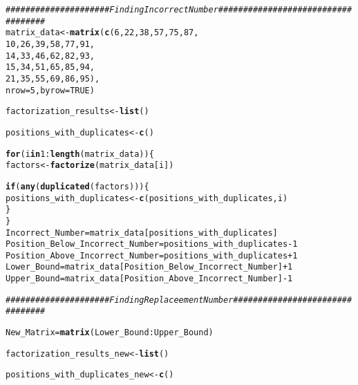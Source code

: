 \documentclass{article}\usepackage[]{graphicx}\usepackage[]{xcolor}
\makeatletter
\newcommand{\hlnum}[1]{\textcolor[rgb]{0.686,0.059,0.569}{#1}}%
\newcommand{\hlcom}[1]{\textcolor[rgb]{0.678,0.584,0.686}{\textit{#1}}}%
\newcommand{\hlopt}[1]{\textcolor[rgb]{0,0,0}{#1}}%
\newcommand{\hldef}[1]{\textcolor[rgb]{0.345,0.345,0.345}{#1}}%
\newcommand{\hlkwa}[1]{\textcolor[rgb]{0.161,0.373,0.58}{\textbf{#1}}}%
\newcommand{\hlkwb}[1]{\textcolor[rgb]{0.69,0.353,0.396}{#1}}%
\newcommand{\hlkwc}[1]{\textcolor[rgb]{0.333,0.667,0.333}{#1}}%
\newcommand{\hlkwd}[1]{\textcolor[rgb]{0.737,0.353,0.396}{\textbf{#1}}}%
\newenvironment{kframe}{%
 \def\at@end@of@kframe{}%
 \ifinner\ifhmode%
  \def\at@end@of@kframe{\end{minipage}}%
  \begin{minipage}{\columnwidth}%
 \fi\fi%
 \def\FrameCommand##1{\hskip\@totalleftmargin \hskip-\fboxsep
 \colorbox{shadecolor}{##1}\hskip-\fboxsep
     \hskip-\linewidth \hskip-\@totalleftmargin \hskip\columnwidth}%
 \MakeFramed {\advance\hsize-\width
   \@totalleftmargin\z@ \linewidth\hsize
   \@setminipage}}%
 {\par\unskip\endMakeFramed%
 \at@end@of@kframe}
\newenvironment{knitrout}{}{} %
\makeatother
\begin{document}
\begin{enumerate}
\begin{knitrout}
\begin{kframe}
\begin{alltt}
\hlcom{#####################Finding Incorrect Number###################################}
\hldef{matrix_data} \hlkwb{<-} \hlkwd{matrix}\hldef{(}\hlkwd{c}\hldef{(}\hlnum{6}\hldef{,} \hlnum{22}\hldef{,} \hlnum{38}\hldef{,} \hlnum{57}\hldef{,} \hlnum{75}\hldef{,} \hlnum{87}\hldef{,}
                        \hlnum{10}\hldef{,} \hlnum{26}\hldef{,} \hlnum{39}\hldef{,} \hlnum{58}\hldef{,} \hlnum{77}\hldef{,} \hlnum{91}\hldef{,}
                        \hlnum{14}\hldef{,} \hlnum{33}\hldef{,} \hlnum{46}\hldef{,} \hlnum{62}\hldef{,} \hlnum{82}\hldef{,} \hlnum{93}\hldef{,}
                        \hlnum{15}\hldef{,} \hlnum{34}\hldef{,} \hlnum{51}\hldef{,} \hlnum{65}\hldef{,} \hlnum{85}\hldef{,} \hlnum{94}\hldef{,}
                        \hlnum{21}\hldef{,} \hlnum{35}\hldef{,} \hlnum{55}\hldef{,} \hlnum{69}\hldef{,} \hlnum{86}\hldef{,} \hlnum{95}\hldef{),}
                      \hlkwc{nrow} \hldef{=} \hlnum{5}\hldef{,} \hlkwc{byrow} \hldef{=} \hlnum{TRUE}\hldef{)}

\hldef{factorization_results} \hlkwb{<-} \hlkwd{list}\hldef{()}

\hldef{positions_with_duplicates} \hlkwb{<-} \hlkwd{c}\hldef{()}

\hlkwa{for} \hldef{(i} \hlkwa{in} \hlnum{1}\hlopt{:}\hlkwd{length}\hldef{(matrix_data)) \{}
  \hldef{factors} \hlkwb{<-} \hlkwd{factorize}\hldef{(matrix_data[i])}

  \hlkwa{if} \hldef{(}\hlkwd{any}\hldef{(}\hlkwd{duplicated}\hldef{(factors))) \{}
    \hldef{positions_with_duplicates} \hlkwb{<-} \hlkwd{c}\hldef{(positions_with_duplicates, i)}
  \hldef{\}}
\hldef{\}}
\hldef{Incorrect_Number} \hlkwb{=} \hldef{matrix_data[positions_with_duplicates]}
\hldef{Position_Below_Incorrect_Number} \hlkwb{=} \hldef{positions_with_duplicates} \hlopt{-} \hlnum{1}
\hldef{Position_Above_Incorrect_Number} \hlkwb{=} \hldef{positions_with_duplicates} \hlopt{+} \hlnum{1}
\hldef{Lower_Bound} \hlkwb{=} \hldef{matrix_data[Position_Below_Incorrect_Number]} \hlopt{+} \hlnum{1}
\hldef{Upper_Bound} \hlkwb{=} \hldef{matrix_data[Position_Above_Incorrect_Number]} \hlopt{-}\hlnum{1}

\hlcom{#####################Finding Replaceement Number################################}

\hldef{New_Matrix} \hlkwb{=} \hlkwd{matrix}\hldef{(Lower_Bound}\hlopt{:}\hldef{Upper_Bound)}

\hldef{factorization_results_new} \hlkwb{<-} \hlkwd{list}\hldef{()}

\hldef{positions_with_duplicates_new} \hlkwb{<-} \hlkwd{c}\hldef{()}


\end{alltt}
\end{kframe}
\end{knitrout}
\end{enumerate}
\end{document}
